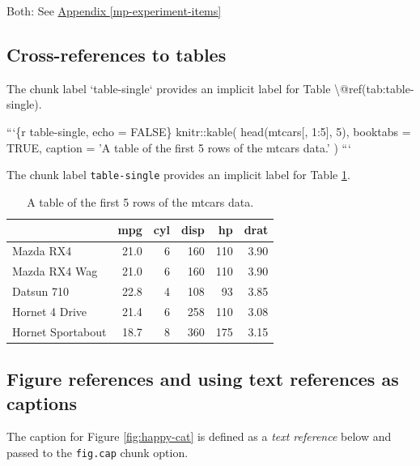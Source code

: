 \documentclass [11pt, proquest] {uwthesis}[2015/03/03]
\newenvironment{Shaded}{}{}
\newcommand{\BaseNTok}[1]{\textcolor[rgb]{0.25,0.63,0.44}{{#1}}}
\newcommand{\NormalTok}[1]{{#1}}
\begin{document}
Both: See \protect\hyperlink{mp-experiment-items}{Appendix
\ref{mp-experiment-items}}

\subsection{Cross-references to
tables}\label{cross-references-to-tables}
\begin{Shaded}
\begin{Highlighting}[]
\NormalTok{The chunk label }\BaseNTok{`table-single`}\NormalTok{ provides an implicit label }
\NormalTok{for Table \textbackslash{}@ref(tab:table-single).}

\NormalTok{```\{r table-single, echo = FALSE\}}
\NormalTok{knitr::kable(}
\NormalTok{  head(mtcars[, 1:5], 5), booktabs = TRUE,}
\NormalTok{  caption = 'A table of the first 5 rows of the mtcars data.'}
\NormalTok{)}
\NormalTok{```}
\end{Highlighting}
\end{Shaded}
The chunk label \texttt{table-single} provides an implicit label for
Table \ref{tab:table-single}.
\begin{table}

\caption{\label{tab:table-single}A table of the first 5 rows of the mtcars data.}
\centering
\begin{tabular}[t]{lrrrrr}
\toprule
  & mpg & cyl & disp & hp & drat\\
\midrule
Mazda RX4 & 21.0 & 6 & 160 & 110 & 3.90\\
Mazda RX4 Wag & 21.0 & 6 & 160 & 110 & 3.90\\
Datsun 710 & 22.8 & 4 & 108 & 93 & 3.85\\
Hornet 4 Drive & 21.4 & 6 & 258 & 110 & 3.08\\
Hornet Sportabout & 18.7 & 8 & 360 & 175 & 3.15\\
\bottomrule
\end{tabular}
\end{table}
\subsection{Figure references and using text references as
captions}\label{figure-references-and-using-text-references-as-captions}
\begin{Shaded}
\end{Shaded}
The caption for Figure \ref{fig:happy-cat} is defined as a \emph{text
reference} below and passed to the \texttt{fig.cap} chunk option.
\end{document}
